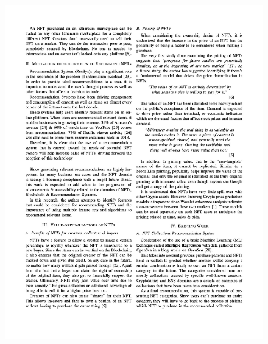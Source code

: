 \begin{figure}[h!]
\centering
\includegraphics[width=\textwidth]{images/appendix/papers/analysis/An Analysis of the Features Considerable for NFT Recommendations 2.jpeg}
\end{figure}

